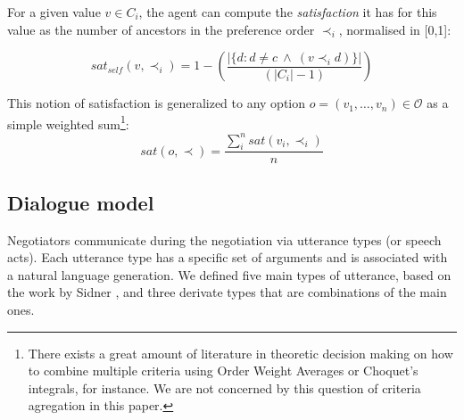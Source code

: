 \documentclass{llncs}
\begin{document}
	For a given value $v\in C_i$, the agent can compute the \emph{satisfaction} it has for this value as the number of ancestors in the preference order $\prec_i$, normalised in [0,1]:
	
	\begin{equation}
	sat_{self}(v, \prec_i) =	1 - \left( \frac{|\{d : d \neq c \  \wedge \ (v \prec_i d)\}| }{( |C_i| - 1 )}\right)
	\end{equation}
	
	This notion of satisfaction is generalized to any option $o=(v_1,\ldots,v_n) \in \mathcal{O}$ as a simple weighted sum\footnote{There exists a great amount of literature in theoretic decision making on how to combine multiple criteria using Order Weight Averages or Choquet's integrals, for instance. We are not concerned by this question of criteria agregation in this paper.}:
	\begin{equation}
	sat(o, \prec) = \frac{\sum_{i}^{n} sat(v_i, \prec_i) }{n}
	\end{equation}
	
	\subsection{Dialogue model}
	Negotiators communicate during the negotiation via utterance types (or speech acts). Each utterance type has a specific set of arguments and is associated with a natural language generation. We defined five main types of utterance, based on the work by Sidner \cite{sidnerartificial}, and three derivate types that are combinations of the main ones.
		
\end{document}
